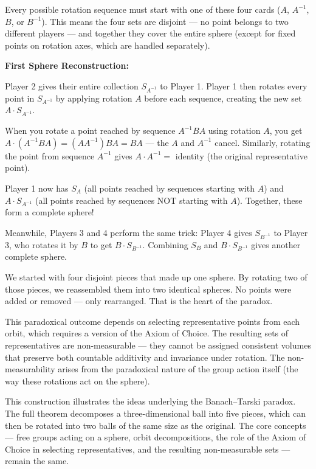 Every possible rotation sequence must start with one of these four cards ($A$, $A^{-1}$, $B$, or $B^{-1}$). This means the four sets are disjoint — no point belongs to two different players — and together they cover the entire sphere (except for fixed points on rotation axes, which are handled separately).

\textbf{First Sphere Reconstruction:}

Player 2 gives their entire collection $S_{A^{-1}}$ to Player 1. Player 1 then rotates every point in $S_{A^{-1}}$ by applying rotation $A$ before each sequence, creating the new set $A \cdot S_{A^{-1}}$.

When you rotate a point reached by sequence $A^{-1}BA$ using rotation $A$, you get $A \cdot (A^{-1}BA) = (AA^{-1})BA = BA$ — the $A$ and $A^{-1}$ cancel. Similarly, rotating the point from sequence $A^{-1}$ gives $A \cdot A^{-1} = $ identity (the original representative point).

Player 1 now has $S_A$ (all points reached by sequences starting with $A$) and $A \cdot S_{A^{-1}}$ (all points reached by sequences NOT starting with $A$). Together, these form a complete sphere!

Meanwhile, Players 3 and 4 perform the same trick: Player 4 gives $S_{B^{-1}}$ to Player 3, who rotates it by $B$ to get $B \cdot S_{B^{-1}}$. Combining $S_B$ and $B \cdot S_{B^{-1}}$ gives another complete sphere.

We started with four disjoint pieces that made up one sphere. By rotating two of those pieces, we reassembled them into two identical spheres. No points were added or removed — only rearranged. That is the heart of the paradox.

This paradoxical outcome depends on selecting representative points from each orbit, which requires a version of the Axiom of Choice. The resulting sets of representatives are non-measurable — they cannot be assigned consistent volumes that preserve both countable additivity and invariance under rotation. The non-measurability arises from the paradoxical nature of the group action itself (the way these rotations act on the sphere).

This construction illustrates the ideas underlying the Banach–Tarski paradox. The full theorem decomposes a three-dimensional ball into five pieces, which can then be rotated into two balls of the same size as the original. The core concepts — free groups acting on a sphere, orbit decompositions, the role of the Axiom of Choice in selecting representatives, and the resulting non-measurable sets — remain the same.

